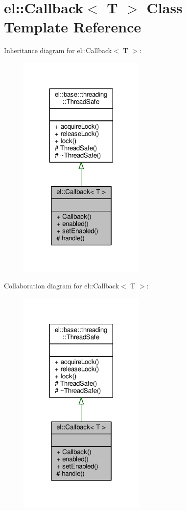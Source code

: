 \hypertarget{classel_1_1Callback}{}\section{el\+:\+:Callback$<$ T $>$ Class Template Reference}
\label{classel_1_1Callback}


Inheritance diagram for el\+:\+:Callback$<$ T $>$\+:
\nopagebreak
\begin{figure}[H]
\begin{center}
\leavevmode
\includegraphics[width=177pt]{df/df5/classel_1_1Callback__inherit__graph}
\end{center}
\end{figure}


Collaboration diagram for el\+:\+:Callback$<$ T $>$\+:
\nopagebreak
\begin{figure}[H]
\begin{center}
\leavevmode
\includegraphics[width=177pt]{dc/d58/classel_1_1Callback__coll__graph}
\end{center}
\end{figure}
